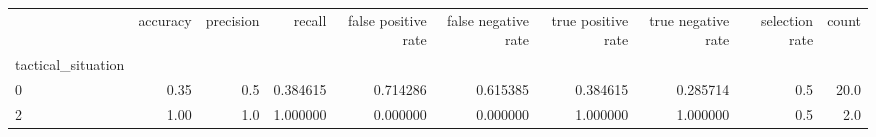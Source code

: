 \begin{tabular}{lrrrrrrrrr}
\toprule
{} &  accuracy &  precision &    recall &  false positive rate &  false negative rate &  true positive rate &  true negative rate &  selection rate &  count \\
tactical\_situation &           &            &           &                      &                      &                     &                     &                 &        \\
\midrule
0                  &      0.35 &        0.5 &  0.384615 &             0.714286 &             0.615385 &            0.384615 &            0.285714 &             0.5 &   20.0 \\
2                  &      1.00 &        1.0 &  1.000000 &             0.000000 &             0.000000 &            1.000000 &            1.000000 &             0.5 &    2.0 \\
\bottomrule
\end{tabular}
